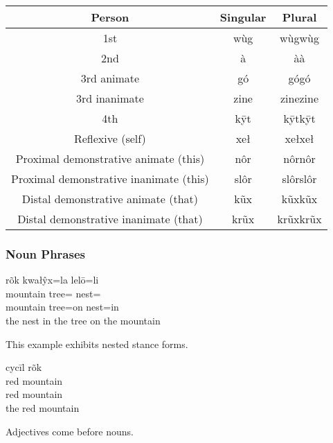 \documentclass[12pt]{article}
\begin{document}
    \begin{center}
        \begin{tabular}{|c|c|c|}
            \hline
            Person                                  & Singular & Plural   \\
            \hline
            1st                                     & wùg      & wùgwùg   \\
            \hline
            2nd                                     & à        & àà       \\
            \hline
            3rd animate                             & gó       & gógó     \\
            \hline
            3rd inanimate                           & zine     & zinezine \\
            \hline
            4th                                     & kȳt      & kȳtkȳt   \\
            \hline
            Reflexive (self)                        & xeł      & xełxeł   \\
            \hline
            Proximal demonstrative animate (this)   & nôr      & nôrnôr   \\
            \hline
            Proximal demonstrative inanimate (this) & slôr     & slôrslôr \\
            \hline
            Distal demonstrative animate (that)     & kũx      & kũxkũx   \\
            \hline
            Distal demonstrative inanimate (that)   & krũx     & krũxkrũx \\
            \hline
        \end{tabular}
    \end{center}

    \subsubsection*{Noun Phrases}

    \begin{exe}
        \ex
        \glll
        rõk kwałŷx=la lelō=li \\
        mountain tree=\AdessThree{} nest=\InessThree{} \\
        mountain tree=on nest=in \\
        \glt
        the nest in the tree on the mountain
    \end{exe}
    This example exhibits nested stance forms.

    \begin{exe}
        \ex
        \glll
        cycīl rõk \\
        red mountain \\
        red mountain \\
        \glt
        the red mountain
    \end{exe}
    Adjectives come before nouns.
\end{document}
